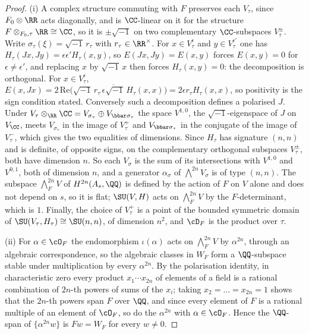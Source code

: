 \begin{proof}
(i) A complex structure commuting with $F$ preserves each $V_{\tau}$, since
$F_{0}\otimes\RR$ acts diagonally, and is $\CC$-linear on it for the
structure $F\otimes_{F_{0},\tau}\RR\cong\CC$, so it is $\pm\sqrt{-1}$ on two
complementary $\CC$-subspaces $V_{\tau}^{\pm}$. Write
$\sigma_{\tau}(\xi)=\sqrt{-1}\,r_{\tau}$ with $r_{\tau}\in\RR^{\times}$. For
$x\in V^{\epsilon}_{\tau}$ and $y\in V^{\epsilon'}_{\tau}$ one has
$H_{\tau}(Jx,Jy)=\epsilon\epsilon'H_{\tau}(x,y)$, so
$E(Jx,Jy)=E(x,y)$ forces $E(x,y)=0$ for $\epsilon\ne\epsilon'$, and replacing
$x$ by $\sqrt{-1}\,x$ then forces $H_{\tau}(x,y)=0$: the decomposition is
orthogonal. For $x\in V^{\epsilon}_{\tau}$,
$E(x,Jx)=2\,\mathrm{Re}\bigl(\sqrt{-1}\,r_{\tau}\,
\overline{\epsilon\sqrt{-1}}\,H_{\tau}(x,x)\bigr)=2\epsilon r_{\tau}H_{\tau}(x,x)$,
so positivity is the sign condition stated. Conversely such a decomposition
defines a polarised $J$. Under $V_{\tau}\otimes_{\RR}\CC=V_{\sigma_{\tau}}
\oplus V_{\bbar\sigma_{\tau}}$ the space $V^{1,0}$, the $\sqrt{-1}$-eigenspace
of $J$ on $V_{\CC}$, meets $V_{\sigma_{\tau}}$ in the image of $V_{\tau}^{+}$
and $V_{\bbar\sigma_{\tau}}$ in the conjugate of the image of $V_{\tau}^{-}$,
which gives the two equalities of dimensions. Since $H_{\tau}$ has signature
$(n,n)$ and is definite, of opposite signs, on the complementary orthogonal
subspaces $V_{\tau}^{\pm}$, both have dimension $n$. So each $V_{\sigma}$ is
the sum of its intersections with $V^{1,0}$ and $V^{0,1}$, both of dimension
$n$, and a generator $\alpha_{\sigma}$ of $\bigwedge^{2n}V_{\sigma}$ is of
type $(n,n)$. The subspace $\bigwedge^{2n}_{F}V$ of $H^{2n}(A_{s},\QQ)$ is
defined by the action of $F$ on $V$ alone and does not depend on $s$, so it
is flat; $\SU(V,H)$ acts on $\bigwedge^{2n}_{F}V$ by the $F$-determinant,
which is $1$. Finally, the choice of $V_{\tau}^{+}$ is a point of the bounded
symmetric domain of $\SU(V_{\tau},H_{\tau})\cong\SU(n,n)$, of dimension
$n^{2}$, and $\cD_{F}$ is the product over $\tau$.

(ii) For $\alpha\in\cO_{F}$ the endomorphism $\iota(\alpha)$ acts on
$\bigwedge^{2n}_{F}V$ by $\alpha^{2n}$, through an algebraic correspondence,
so the algebraic classes in $W_{F}$ form a $\QQ$-subspace stable under
multiplication by every $\alpha^{2n}$. By the polarisation identity, in
characteristic zero every product $x_{1}\cdots x_{2n}$ of elements of a field
is a rational combination of $2n$-th powers of sums of the $x_{i}$; taking
$x_{2}=\dots=x_{2n}=1$ shows that the $2n$-th powers span $F$ over $\QQ$, and
since every element of $F$ is a rational multiple of an element of $\cO_{F}$,
so do the $\alpha^{2n}$ with $\alpha\in\cO_{F}$. Hence the $\QQ$-span of
$\{\alpha^{2n}w\}$ is $Fw=W_{F}$ for every $w\ne0$.


\end{proof}
